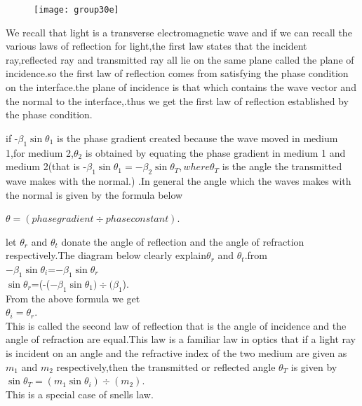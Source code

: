 \begin{figure}
\centering
\texttt{[image: group30e]}
\caption{}
\label{fig:group30e}
\end{figure}


We recall that light is a transverse electromagnetic wave and if we can recall the various laws of reflection for light,the first law states that the incident ray,reflected ray and transmitted ray all lie on the same plane called the plane of incidence.so the first law of reflection comes from satisfying the phase condition on the interface.the plane of incidence is that which  contains the wave vector and the normal to the interface,.thus we get the first law of reflection established by the phase condition.

if -$\beta_1\sin \theta_1$ is the phase gradient created because the wave moved in medium 1,for medium 2,$ 
\theta_2$ is obtained by equating the phase gradient in medium 1 and medium 2(that is -$\beta_1\sin \theta_1=-\beta_2\sin \theta_T,where \theta_T$ is the angle the transmitted wave makes with the normal.) .In general the angle which the waves makes with the normal is given by the formula below

$\theta=(phase gradient\div phase constant)$.

let $\theta_r$ and $\theta_t$ donate the angle of reflection and the angle of refraction respectively.The diagram below clearly explain$\theta_r$ and $\theta_t$.from\\  $-\beta_1\sin \theta_i$=$-\beta_1\sin \theta_r$\\ 

$\sin \theta_r$=(-($-\beta_1\sin \theta_1) \div(\beta_1$).\\From the above formula we get\\ $\theta_i=\theta_r$.\\This is called the second law of reflection that is the angle of incidence and the angle of refraction are equal.This law is a familiar law in optics that if a light ray is incident on an angle and the refractive index of the two medium are given as $m_1$ and $m_2$ respectively,then the transmitted or reflected angle $\theta_T$  is given by 
\\ $\sin \theta_T=(m_1\sin\theta_i)\div(m_2)$.\\This is a special case of snells law.


